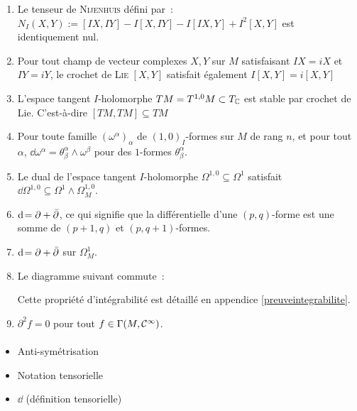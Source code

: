 \documentclass[12pt,draft]{article}
\begin{document}
\begin{enumerate}[($i$)]
\item Le tenseur de \textsc{Nijenhuis} défini par~: $N_I(X,Y) := [ I X , I Y ] - I [ X , I Y ] - I [ I X , Y ] + I^2 [ X , Y ]$ est identiquement nul.
\item Pour tout champ de vecteur complexes $X,Y$ sur $M$ satisfaisant $I X=iX$ et $I Y=iY$, le crochet de \textsc{Lie} $[X,Y]$ satisfait également $I[X,Y] = i[X,Y]$
\item L'espace tangent $I$-holomorphe $TM = T^{1,0}M \subset T_{\mathbb{C}}$  est stable par crochet de Lie. C'est-à-dire $[TM,TM] \subseteq TM$
\item Pour toute famille $(\omega^\alpha)_\alpha$ de $(1,0)_I$-formes sur $M$ de rang $n$, et pour tout $\alpha$, $\dd \omega^\alpha = \theta^\alpha_\beta \wedge \omega^\beta$ pour des $1$-formes $\theta^\alpha_\beta$.
\item Le dual de l'espace tangent $I$-holomorphe $\Omega^{1,0} \subseteq \Omega^1$ satisfait $\dd \Omega^{1,0} \subseteq \Omega^1 \wedge \Omega^{1,0}_M$.
\item $\operatorname{d\!} = \partial + \operatorname{\bar{\partial}}$, ce qui signifie que la différentielle d'une $(p,q)$-forme est une somme de $(p+1,q)$ et $(p,q+1)$-formes.
\item $\operatorname{d\!}  = \partial + \operatorname{\bar{\partial}}$ sur $\Omega^1_M$.
\item Le diagramme suivant commute~:
\begin{center}\end{center}
Cette propriété d'intégrabilité est détaillé en appendice \autoref{preuveintegrabilite}.
\item $\partial^2 f = 0$ pour tout $f \in\Gamma(M,\mathcal{C}^\infty)$.
\end{enumerate}

\paragraph*{\todo}
\begin{itemize}
\item Anti-symétrisation
\item Notation tensorielle
\item $\dd$ (définition tensorielle)
\end{itemize}
\end{document}
